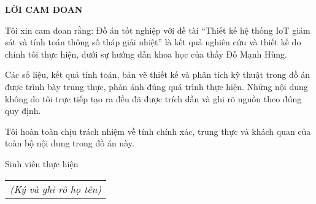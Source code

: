 \documentclass[../main.tex]{subfiles}
\begin{document}
\begin{center}
    \Large{\textbf{LỜI CAM ĐOAN}}\\
\end{center}
\vspace{1cm}

Tôi xin cam đoan rằng: Đồ án tốt nghiệp với đề tài “Thiết kế hệ thống IoT giám sát và tính toán thông số tháp giải nhiệt” là kết quả nghiên cứu và thiết kế do chính tôi thực hiện, dưới sự hướng dẫn khoa học của thầy Đỗ Mạnh Hùng.

Các số liệu, kết quả tính toán, bản vẽ thiết kế và phân tích kỹ thuật trong đồ án được trình bày trung thực, phản ánh đúng quá trình thực hiện. Những nội dung không do tôi trực tiếp tạo ra đều đã được trích dẫn và ghi rõ nguồn theo đúng quy định.

Tôi hoàn toàn chịu trách nhiệm về tính chính xác, trung thực và khách quan của toàn bộ nội dung trong đồ án này.

\begin{flushright}
Sinh viên thực hiện\\
\begin{tabular}{@{}c@{}}
\textit{(Ký và ghi rõ họ tên)}
\end{tabular}
\end{flushright}
\end{document}
